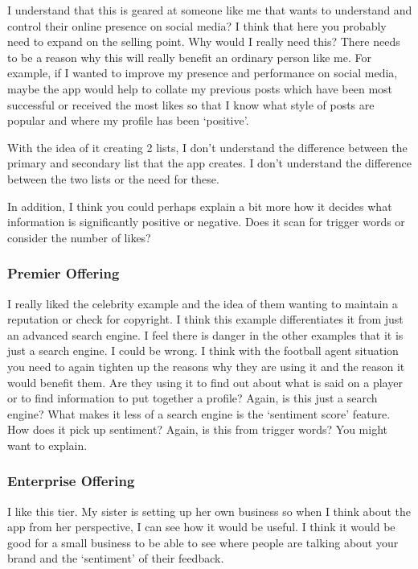       I understand that this is geared at someone like me that wants to understand and control their online presence on social media? I think that here you probably need to expand on the selling point. Why would I really need this? There needs to be a reason why this will really benefit an ordinary person like me. For example, if I wanted to improve my presence and performance on social media, maybe the app would help to collate my previous posts which have been most successful or received the most likes so that I know what style of posts are popular and where my profile has been `positive'.

      With the idea of it creating 2 lists, I don't understand the difference between the primary and secondary list that the app creates. I don't understand the difference between the two lists or the need for these.

      In addition, I think you could perhaps explain a bit more how it decides what information is significantly positive or negative. Does it scan for trigger words or consider the number of likes?

    \subsubsection{Premier Offering}

      I really liked the celebrity example and the idea of them wanting to maintain a reputation or check for copyright. I think this example differentiates it from just an advanced search engine. I feel there is danger in the other examples that it is just a search engine. I could be wrong. I think with the football agent situation you need to again tighten up the reasons why they are using it and the reason it would benefit them. Are they using it to find out about what is said on a player or to find information to put together a profile? Again, is this just a search engine? What makes it less of a search engine is the `sentiment score' feature. How does it pick up sentiment? Again, is this from trigger words? You might want to explain.

    \subsubsection{Enterprise Offering}

      I like this tier. My sister is setting up her own business so when I think about the app from her perspective, I can see how it would be useful. I think it would be good for a small business to be able to see where people are talking about your brand and the `sentiment' of their feedback.

